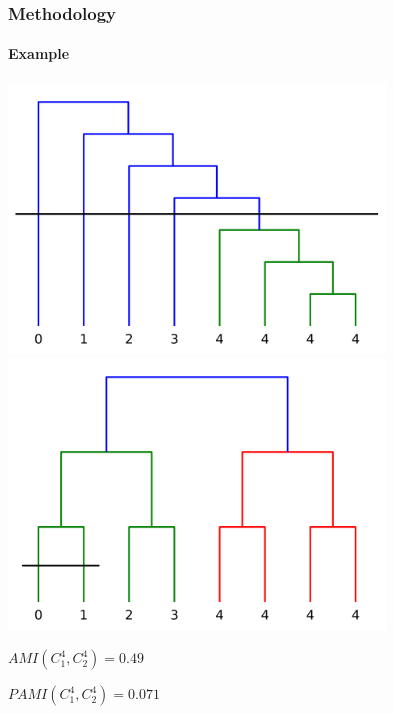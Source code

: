 \documentclass{tum-presentation}
\begin{document}
\begin{frame}
	\frametitle{Methodology}
	\framesubtitle{Example}
	\begin{center}
		\includegraphics[width = 10cm]{../figures/caterpilar_tree_level_4-1.png}\hspace{.5cm}\vline\hspace{.5cm}
		\includegraphics[width = 10cm]{../figures/binary_tree_level_4-1.png}
	\end{center}
	\begin{center}
		$AMI(C_1^{4}, C_2^{4}) = 0.49$
		
		$PAMI(C_1^{4}, C_2^{4}) = 0.071$
	\end{center}	
\end{frame} 
\end{document}

